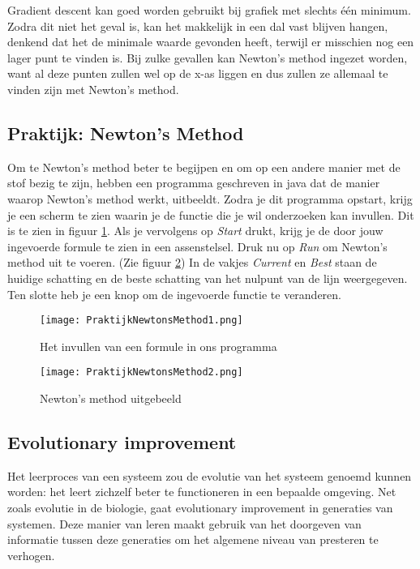Gradient descent kan goed worden gebruikt bij grafiek met slechts \'e\'en minimum. Zodra dit niet het geval is, kan het makkelijk in een dal vast blijven hangen, denkend dat het de minimale waarde gevonden heeft, terwijl er misschien nog een lager punt te vinden is. Bij zulke gevallen kan Newton's method ingezet worden, want al deze punten zullen wel op de x-as liggen en dus zullen ze allemaal te vinden zijn met Newton's method.

\textcolor{praktijk}{
\subsection{Praktijk: Newton's Method}
}
Om te Newton's method beter te begijpen en om op een andere manier met de stof bezig te zijn, hebben een programma geschreven in java dat de manier waarop Newton's method werkt, uitbeeldt. Zodra je dit programma opstart, krijg je een scherm te zien waarin je de functie die je wil onderzoeken kan invullen. Dit is te zien in figuur \ref{fig:PraktijkNewtonsMethod1}. Als je vervolgens op \textit{Start} drukt, krijg je de door jouw ingevoerde formule te zien in een assenstelsel. Druk nu op \textit{Run} om Newton's method uit te voeren. (Zie figuur \ref{fig:PraktijkNewtonsMethod2}) In de vakjes \textit{Current} en \textit{Best} staan de huidige schatting en de beste schatting van het nulpunt van de lijn weergegeven. Ten slotte heb je een knop om de ingevoerde functie te veranderen.

\begin{figure}[h]
  \centering
    \texttt{[image: PraktijkNewtonsMethod1.png]}
  \caption{Het invullen van een formule in ons programma}
  \label{fig:PraktijkNewtonsMethod1}
\end{figure}

\begin{figure}[H]
  \centering
    \texttt{[image: PraktijkNewtonsMethod2.png]}
  \caption{Newton's method uitgebeeld}
  \label{fig:PraktijkNewtonsMethod2}
\end{figure}

\subsection{Evolutionary improvement}
Het leerproces van een systeem zou de evolutie van het systeem genoemd kunnen worden: het leert zichzelf beter te functioneren in een bepaalde omgeving. Net zoals evolutie in de biologie, gaat evolutionary improvement in generaties van systemen. Deze manier van leren maakt gebruik van het doorgeven van informatie tussen deze generaties om het algemene niveau van presteren te verhogen.

